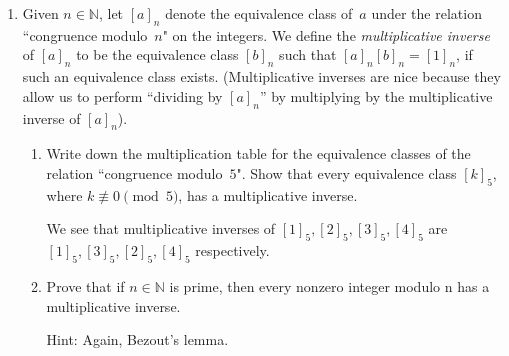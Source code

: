 \documentclass[12pt]{article}
\begin{document}
\begin{enumerate}
\item Given $n\in\mathbb{N}$, let $[a]_n$ denote the equivalence class of~$a$ under the relation ``congruence modulo~$n$" on the integers. We define the {\em multiplicative inverse} of $[a]_n$ to be the equivalence class $[b]_n$ such that $[a]_n[b]_n=[1]_n$, if such an equivalence class exists. (Multiplicative inverses are nice because they allow us to perform ``dividing by $[a]_n$'' by multiplying by the multiplicative inverse of $[a]_n$).

\begin{enumerate}
\item Write down the multiplication table for the equivalence classes of the relation ``congruence modulo~$5$". Show that every equivalence class $[k]_5$, where $k\not\equiv 0\pmod 5$, has a multiplicative inverse.


\vspace{10pt}
We see that multiplicative inverses of $[1]_5, [2]_5,[3]_5,[4]_5$ are $[1]_5, [3]_5,[2]_5,[4]_5$ respectively.

\item Prove that if $n\in\mathbb{N}$ is prime, then every nonzero integer modulo n has a multiplicative inverse. 

Hint: Again, Bezout's lemma.

\end{enumerate}


\end{enumerate}
\end{document}
